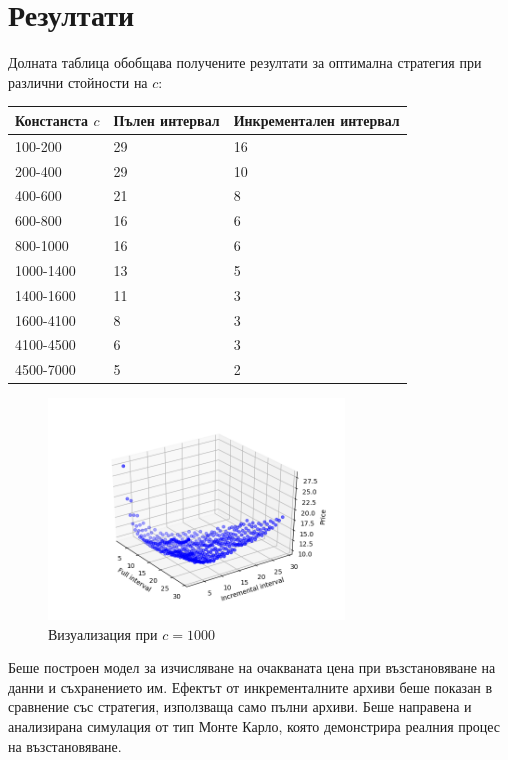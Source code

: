 \documentclass[11pt, a4paper]{article}
\theoremstyle{definition}
\begin{document}
	\section{Резултати}
			Долната таблица обобщава получените резултати за оптимална стратегия при различни стойности на $c$:
			\begin{center}
				\begin{tabular}{| l | l | l |}
					\hline
					Констанста $c$ & Пълен интервал & Инкрементален интервал\\ \hline
					100-200 & 29 & 16\\ \hline
					200-400 & 29 & 10\\ \hline
					400-600 & 21 & 8\\ \hline
					600-800 & 16 & 6\\ \hline
					800-1000 & 16 & 6\\ \hline
					1000-1400 & 13 & 5\\ \hline
					1400-1600 & 11 & 3\\ \hline
					1600-4100 & 8 & 3\\ \hline
					4100-4500 & 6 & 3\\ \hline
					4500-7000 & 5 & 2\\ \hline
				\end{tabular}
			\end{center}
			\begin{figure}[H]
				\begin{minipage}{1.0\textwidth}
					\centering
					\includegraphics[width=0.7\textwidth]{3d_all_1.png}
					\caption{Визуализация при $c=1000$}\label{Fig:Whole_model}
				\end{minipage}
			\end{figure}
			Беше построен модел за изчисляване на очакваната цена при възстановяване на данни и съхранението им. Ефектът от инкременталните архиви беше показан в сравнение със стратегия, използваща само пълни архиви. Беше направена и анализирана симулация от тип Монте Карло, която демонстрира реалния процес на възстановяване.
\newpage
\end{document}
